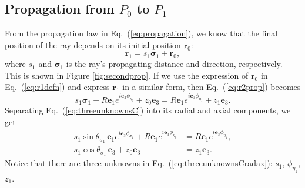 \documentclass[a4paper,twocolumn,superscriptaddress]{revtex4-1}
\begin{document}
{%





\subsection{Propagation from $P_0$ to $P_1$}
\label{sec:propagationatC}

From the propagation law in Eq.~(\ref{eq:propagation}), we know that the final position of the ray depends on its initial position $\mathbf  r_0$:
\begin{equation} 
  \label{eq:r2prop}
  \mathbf  r_1 = s_1 \bm \sigma_1 + \mathbf  r_0 ,
\end{equation}
where $s_1$ and $\bm \sigma_1$ is the ray's propagating distance and direction, respectively.
This is shown in Figure \ref{fig:secondprop}.
If we use the expression of $\mathbf  r_0$  in Eq.~(\ref{eq:r1defn}) and express
$\mathbf  r_1$ in a similar form, then Eq.~(\ref{eq:r2prop}) becomes
\begin{equation} \label{eq:threeunknownsC}
  s_1 \bm \sigma_1 + R \mathbf e_1 e^{i \mathbf e_3 \phi_{ \eta_0 }} + z_0 \mathbf e_3 = 
  R \mathbf e_1 e^{i \mathbf e_3 \phi_{ \eta_1 }} + z_1 \mathbf e_3 .
\end{equation}
Separating Eq.~(\ref{eq:threeunknownsC}) into its radial and axial components, we get
\begin{subequations} 
  \label{eq:threeunknownsCradax}
  \begin{align}
    \label{eq:threeunknownsCradial}
    s_1 \sin \theta_{ \sigma_1 } \, \mathbf e_1 e^{ i \mathbf e_3 \phi_{ \sigma_1 } } 
    + R \mathbf e_1 e^{i \mathbf e_3 \phi_{ \eta_0 }}
    &= 
    R \mathbf e_1 e^{i \mathbf e_3 \phi_{ \eta_1 }} ,
    \\
    \label{eq:threeunknownsCaxial}
    s_1 \cos \theta_{ \sigma_1 } \, \mathbf e_3 
    + z_0 \mathbf e_3 
    &= 
    z_1 \mathbf e_3 .
  \end{align}
\end{subequations}
Notice that there are three unknowns in Eq.~(\ref{eq:threeunknownsCradax}): $s_1$, $\phi_{ \eta_1 }$, $z_1$. 

}
\end{document}
